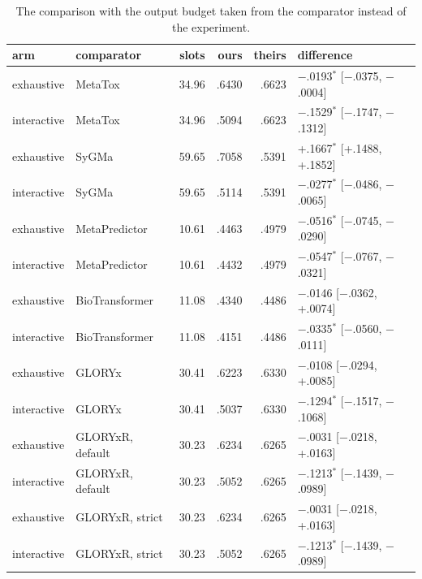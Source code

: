 \begin{table}[t]
\centering\small
\begin{threeparttable}
\caption{The comparison with the output budget taken from the comparator instead of the experiment.}
\label{tab:si-matched}
\begin{tabular}{llrrrl}
\toprule
arm & comparator & slots & ours & theirs & difference \\
\midrule
exhaustive & MetaTox & 34.96 & .6430 & .6623 & $-$.0193$^{*}$ [$-$.0375, $-$.0004] \\
interactive & MetaTox & 34.96 & .5094 & .6623 & $-$.1529$^{*}$ [$-$.1747, $-$.1312] \\
exhaustive & SyGMa & 59.65 & .7058 & .5391 & +.1667$^{*}$ [+.1488, +.1852] \\
interactive & SyGMa & 59.65 & .5114 & .5391 & $-$.0277$^{*}$ [$-$.0486, $-$.0065] \\
exhaustive & MetaPredictor & 10.61 & .4463 & .4979 & $-$.0516$^{*}$ [$-$.0745, $-$.0290] \\
interactive & MetaPredictor & 10.61 & .4432 & .4979 & $-$.0547$^{*}$ [$-$.0767, $-$.0321] \\
exhaustive & BioTransformer & 11.08 & .4340 & .4486 & $-$.0146 [$-$.0362, +.0074] \\
interactive & BioTransformer & 11.08 & .4151 & .4486 & $-$.0335$^{*}$ [$-$.0560, $-$.0111] \\
exhaustive & GLORYx & 30.41 & .6223 & .6330 & $-$.0108 [$-$.0294, +.0085] \\
interactive & GLORYx & 30.41 & .5037 & .6330 & $-$.1294$^{*}$ [$-$.1517, $-$.1068] \\
exhaustive & GLORYxR, default & 30.23 & .6234 & .6265 & $-$.0031 [$-$.0218, +.0163] \\
interactive & GLORYxR, default & 30.23 & .5052 & .6265 & $-$.1213$^{*}$ [$-$.1439, $-$.0989] \\
exhaustive & GLORYxR, strict & 30.23 & .6234 & .6265 & $-$.0031 [$-$.0218, +.0163] \\
interactive & GLORYxR, strict & 30.23 & .5052 & .6265 & $-$.1213$^{*}$ [$-$.1439, $-$.0989] \\
\bottomrule
\end{tabular}
\begin{tablenotes}[flushleft]\footnotesize

\end{tablenotes}
\end{threeparttable}
\end{table}
